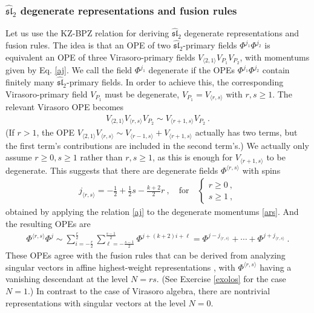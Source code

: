 \documentclass[12pt, a4paper, notitlepage, twoside]{report}
\numberwithin{equation}{section}
\theoremstyle{break}
\begin{document}
\subsubsection{\texorpdfstring{$\widehat{\mathfrak{sl}}_2$}{sl2} degenerate representations and fusion rules}

Let us use the KZ-BPZ relation for deriving $\widehat{\mathfrak{sl}}_2$ degenerate representations and fusion rules. 
The idea is that an OPE of two $\widehat{\mathfrak{sl}}_2$-primary fields $\Phi^{j_1}\Phi^{j_2}$ is equivalent an OPE of three Virasoro-primary fields $V_{\langle 2, 1\rangle}V_{P_1}V_{P_2}$, with momentums given by Eq. \eqref{aj}.
We call the field 
$\Phi^{j_1}$ degenerate if the OPEs $\Phi^{j_1}\Phi^{j_2}$ contain finitely many $\widehat{\mathfrak{sl}}_2$-primary fields.
In order to achieve this, the corresponding Virasoro-primary field $V_{P_1}$ must be degenerate, $V_{P_1}=V_{\langle r, s\rangle}$ with $r,s\geq 1$. 
The relevant Virasoro OPE becomes 
\begin{align}
 V_{\langle 2, 1\rangle}V_{\langle r, s\rangle}V_{P_2} \sim V_{\langle r+1, s\rangle}V_{P_2}\ .
\end{align}
(If $r>1$, the OPE $V_{\langle 2, 1\rangle}V_{\langle r, s\rangle}\sim V_{\langle r-1, s\rangle}+ V_{\langle r+1, s\rangle}$ actually has two terms, but the first term's contributions are included in the second term's.)
We actually only assume $r\geq 0,s\geq 1$ rather than $r,s\geq 1$, as this is enough for $V_{\langle r+1, s\rangle}$ to be degenerate.
This suggests that there are degenerate fields $\Phi^{\langle r,s\rangle}$ with spins
\begin{align}
 j_{\langle r,s\rangle} = -\frac12 +\frac12 s -\frac{k+2}{2} r \ , \quad \text{for} \quad \left\{\begin{array}{l} r\geq 0\ , \\ s\geq 1\ , \end{array}\right.
 \label{jrs}
\end{align}
obtained by applying the relation \eqref{aj} to the degenerate momentums \eqref{ars}. And the resulting OPEs are
\begin{align}
 \Phi^{\langle r, s\rangle}\Phi^j \sim 
 \sum_{i=-\frac{r}{2}}^\frac{r}{2} \sum_{\ell=-\frac{s-1}{2}}^{\frac{s-1}{2}} \Phi^{j+(k+2)i+\ell}
 = \Phi^{j-j_{\langle r,s\rangle}} + \cdots + \Phi^{j+j_{\langle r,s\rangle}}\ .
 \label{prspj}
\end{align}
These OPEs agree with the fusion rules that can be derived from analyzing singular vectors in affine highest-weight representations \cite{ay92}, with $\Phi^{\langle r, s\rangle}$ having a vanishing descendant at the level $N=rs$. (See Exercise \ref{exolos} for the case $N=1$.) In contrast to the case of Virasoro algebra, there are nontrivial representations with singular vectors at the level $N=0$.
\end{document}
